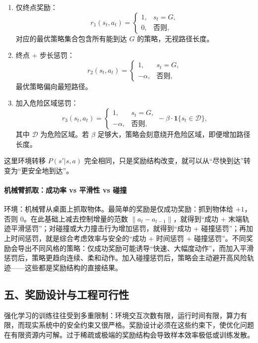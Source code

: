 \begin{enumerate}
  \item 仅终点奖励：
  \[
  r_1(s_t,a_t) =
  \begin{cases}
    1, & s_t = G,\\[3pt]
    0, & \text{否则},
  \end{cases}
  \]
  对应的最优策略集合包含所有能到达 $G$ 的策略，无视路径长度。
  \item 终点 + 步长惩罚：
  \[
  r_2(s_t,a_t) =
  \begin{cases}
    1, & s_t = G,\\[3pt]
    -\alpha, & \text{否则},
  \end{cases}
  \]
  最优策略偏向最短路径。
  \item 加入危险区域惩罚：
  \[
  r_3(s_t,a_t) =
  \begin{cases}
    1, & s_t = G,\\[3pt]
    -\alpha, & \text{否则},
  \end{cases}
  - \beta \cdot \mathbf{1}\{s_t \in \mathcal{D}\},
  \]
  其中 $\mathcal{D}$ 为危险区域。若 $\beta$ 足够大，策略会刻意绕开危险区域，即便增加路径长度。
\end{enumerate}

这里环境转移 $P(s'|s,a)$ 完全相同，只是奖励结构改变，就可以从“尽快到达”转变为“更安全地到达”。

\paragraph{机械臂抓取：成功率 vs 平滑性 vs 碰撞}

环境：机械臂从桌面上抓取物体。最简单的奖励是仅成功奖励：抓到物体给 $+1$，否则 $0$。在此基础上减去控制增量的范数 $\|a_t-a_{t-1}\|$，就得到“成功 + 末端轨迹平滑惩罚”；对碰撞或大力撞击行为增加惩罚，就得到“成功 + 碰撞惩罚”；再加上时间惩罚，就是综合考虑效率与安全的“成功 + 时间惩罚 + 碰撞惩罚”。不同奖励会导出不同风格的策略：仅成功奖励可能诱导“快速、大幅度动作”，而加入平滑惩罚后，策略更趋向连续、柔和动作。加入碰撞惩罚后，策略会主动避开高风险轨迹——这些都是奖励结构的直接结果。

\subsection*{五、奖励设计与工程可行性}

强化学习的训练往往受到多重限制：环境交互次数有限，运行时间有限，算力有限，而现实系统中的安全约束又很严格。奖励设计必须在这些约束下，使优化问题在有限资源内可解。过于稀疏或极端的奖励结构会导致样本效率极低或训练发散。

